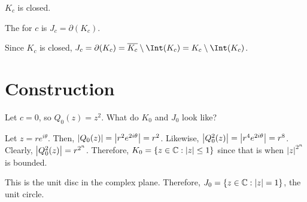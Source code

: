 \documentclass[class=pmath370,tikz,notes]{agony}
\begin{document}
\begin{lemma}[Assignment 4]
  $K_c$ is closed.
\end{lemma}

\begin{defn}
  The  for $c$ is $J_c = \partial(K_c)$.
\end{defn}

\begin{remark}
  Since $K_c$ is closed, $J_c = \partial(K_c) = \overline{K_c} \setminus \Int(K_c) = K_c \setminus \Int(K_c)$.
\end{remark}

\section{Construction}

\begin{example}\label{ex:k0}
  Let $c = 0$, so $Q_0(z) = z^2$. What do $K_0$ and $J_0$ look like?
\end{example}
\begin{sol}
  Let $z = re^{i\theta}$.
  Then, $\abs{Q_0(z)} = \abs{r^2e^{2i\theta}} = r^2$.
  Likewise, $\abs{Q_0^2(z)} = \abs{r^4e^{2i\theta}} = r^8$.
  Clearly, $\abs{Q_0^2(z)} = r^{2^n}$.
  Therefore, $K_0 = \{z \in \mathbb{C} : \abs{z} \leq 1\}$
  since that is when $\abs{z}^{2^n}$ is bounded.

  This is the unit disc in the complex plane.
  Therefore, $J_0 = \{z \in \mathbb{C} : \abs{z} = 1\}$, the unit circle.
\end{sol}
\end{document}
